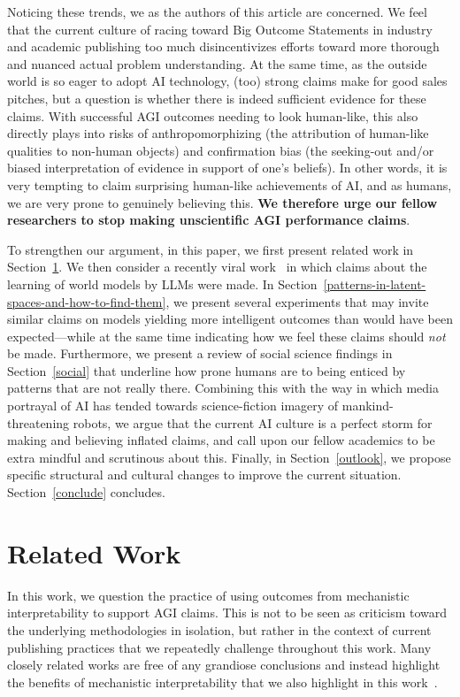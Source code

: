 Noticing these trends, we as the authors of this article are concerned. We feel that the current culture of racing toward Big Outcome Statements in industry and academic publishing too much disincentivizes efforts toward more thorough and nuanced actual problem understanding. At the same time, as the outside world is so eager to adopt AI technology, (too) strong claims make for good sales pitches, but a question is whether there is indeed sufficient evidence for these claims. With successful AGI outcomes needing to look human-like, this also directly plays into risks of anthropomorphizing (the attribution of human-like qualities to non-human objects) and confirmation bias (the seeking-out and/or biased interpretation of evidence in support of one's beliefs). In other words, it is very tempting to claim surprising human-like achievements of AI, and as humans, we are very prone to genuinely believing this. \textbf{We therefore urge our fellow researchers to stop making unscientific AGI performance claims}.

To strengthen our argument, in this paper, we first present related work in Section~\ref*{related}. We then consider a recently viral work~\citep{gurnee2023languagev2} in which claims about the learning of world models by LLMs were made. In Section~\ref*{patterns-in-latent-spaces-and-how-to-find-them}, we present several experiments that may invite similar claims on models yielding more intelligent outcomes than would have been expected---while at the same time indicating how we feel these claims should \emph{not} be made. Furthermore, we present a review of social science findings in Section~\ref*{social} that underline how prone humans are to being enticed by patterns that are not really there. Combining this with the way in which media portrayal of AI has tended towards science-fiction imagery of mankind-threatening robots, we argue that the current AI culture is a perfect storm for making and believing inflated claims, and call upon our fellow academics to be extra mindful and scrutinous about this. Finally, in Section~\ref*{outlook}, we propose specific structural and cultural changes to improve the current situation. Section~\ref*{conclude} concludes. 

\section{Related Work}\label{related}

In this work, we question the practice of using outcomes from mechanistic interpretability to support AGI claims. This is not to be seen as criticism toward the underlying methodologies in isolation, but rather in the context of current publishing practices that we repeatedly challenge throughout this work. Many closely related works are free of any grandiose conclusions and instead highlight the benefits of mechanistic interpretability that we also highlight in this work~\citep{nanda2023emergent,gurnee2023finding,li2022emergent}. 

